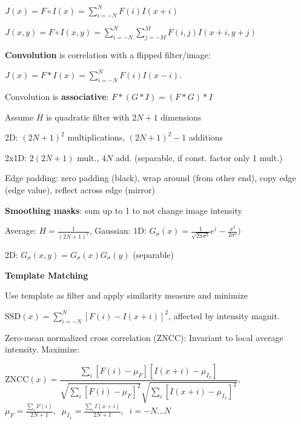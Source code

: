 \documentclass[fontsize=6pt]{scrartcl}
\renewcommand{\exp}[1]{e^{#1}}
\begin{document}
\begin{multicols*}{4}
{\centering
	$J(x) = F \circ I(x) = \sum_{i=-N}^N F(i) I(x + i)$
\par}

{\centering
	$J(x,y) = F \circ I(x,y) = \sum_{i=-N}^N\sum_{j=-M}^M F(i,j) I(x + i, y+ j)$
\par}


\textbf{Convolution} is correlation with a flipped filter/image:

{\centering
	$J(x) = F \ast I(x) = \sum_{i=-N}^N F(i) I(x - i)$.
\par}

Convolution is \textbf{associative}: $F\ast (G \ast I) = (F \ast G ) \ast I$


Assume $H$ is quadratic filter with $2N+1$ dimensions

2D:	$(2N+1)^2$ multiplications, $(2N+1)^2-1$ additions

2x1D: 	$2(2N+1)$ mult., $4N$ add. (separable, if const. factor only 1 mult.)

Edge padding: zero padding (black), wrap around (from other end), copy edge (edge value), reflect across edge (mirror)

\textbf{Smoothing masks}: sum up to 1 to not change image intensity

Average: $H = \frac{1}{(2N + 1)^2}$,
Gaussian: 1D: $G_\sigma(x) = \frac{1}{\sqrt{2\pi\sigma^2}}\exp(-\frac{x^2}{2\sigma^2})$

2D: $G_\sigma(x,y) = G_\sigma(x)G_\sigma(y)$ (separable)

\textbf{Template Matching}

Use template as filter and apply similarity measure and minimize

$\mathrm{SSD}(x) = \sum_{i=-N}^N \left[ F(i) - I(x+i) \right]^2$, affected by intensity magnit.

Zero-mean normalized cross correlation (ZNCC): Invariant to local average intensity. Maximize:

{\centering
	$
	\mathrm{ZNCC}(x) = \dfrac{\sum_i
		\left[F(i)- \mu_F\right] \left[I(x + i) - \mu_{I_x} \right]}
	{
		\sqrt{\sum_i \left[F(i) - \mu_F\right]^2}
		\sqrt{\sum_i \left[I(x+i) - \mu_{I_x}\right]^2}
	},
	$\\[3pt]
	$
	\mu_F = \frac{\sum_i F(i)}{2N + 1},\;\;
	\mu_{I_x} = \frac{\sum_i I(x+i)}{2N + 1},\;\;
	i=-N\ldots N
	$
\par}


\end{multicols*}
\end{document}
